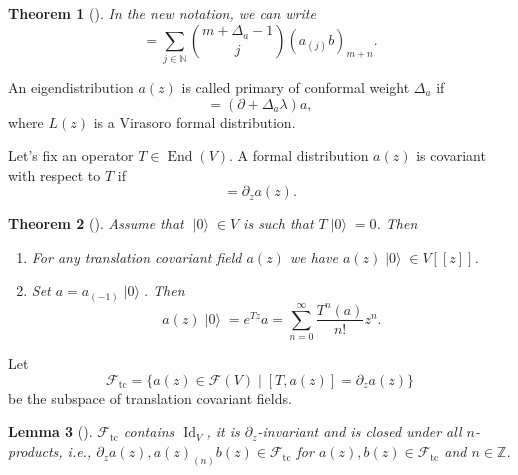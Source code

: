 \documentclass[a4paper, 12pt, reqno]{amsart}
\newtheorem{theorem}{Theorem}[subsection]
\newtheorem{lemma}[theorem]{Lemma}
\theoremstyle{remark}
\numberwithin{equation}{subsection}
\DeclareMathOperator{\Id}{Id}
\DeclareMathOperator{\End}{End}
\DeclareMathOperator{\vac}{|0\rangle}
\DeclareMathOperator{\tc}{tc}
\begin{document}
\begin{theorem}[{\cite[Proposition 3.7.6]{nozaradan_introduction_2008}}]
  \label{thr:10}
  In the new notation, we can write
  \begin{equation*}
    [a_m, b_n] = \sum_{j \in \mathbb{N}}\binom{m + \Delta_a - 1}{j}(a_{(j)}b)_{m + n}.
  \end{equation*}
\end{theorem}

An eigendistribution $a(z)$ is called primary of conformal weight $\Delta_a$ if
\begin{equation*}
  [L_\lambda a]=(\partial +\Delta_a\lambda)a,
\end{equation*}
where $L(z)$ is a Virasoro formal distribution.

Let's fix an operator $T\in \End(V)$.
A formal distribution $a(z)$ is covariant with respect to $T$ if
\begin{equation*}
  [T, a(z)] = \partial_za(z).
\end{equation*}

\begin{theorem}[{\cite[Lemma 1]{callegaro_introduction_2017}}]
  \label{thr:11}
  Assume that $\vac \in V$ is such that $T\vac = 0$.
  Then
  \begin{enumerate}
  \item For any translation covariant field $a(z)$ we have $a(z)\vac \in V[[z]]$.
  \item Set $a = a_{(-1)}\vac$.
    Then
    \begin{equation*}
      a(z)\vac = e^{Tz}a = \sum_{n = 0}^\infty\frac{T^n(a)}{n!}z^n.
    \end{equation*}
  \end{enumerate}
\end{theorem}

Let
\begin{equation*}
  \mathcal{F}_{\tc} = \{a(z) \in \mathcal{F}(V) \mid [T, a(z)] = \partial_za(z)\}
\end{equation*}
be the subspace of translation covariant fields.

\begin{lemma}[{\cite[Lemma 3]{callegaro_introduction_2017}}]
  \label{lmm:3}
  $\mathcal{F}_{\tc}$ contains $\Id_V$, it is $\partial_z$-invariant and is closed under all $n$-products, i.e., $\partial_za(z), a(z)_{(n)}b(z) \in \mathcal{F}_{\tc}$ for $a(z), b(z) \in \mathcal{F}_{\tc}$ and $n \in \mathbb{Z}$.
\end{lemma}
\end{document}
